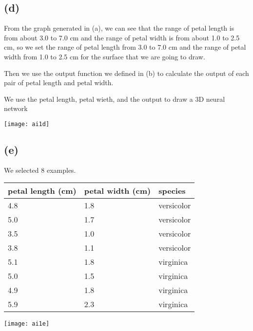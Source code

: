\documentclass[11pt]{article}
\begin{document}
\subsection*{(d)}

From the graph generated in (a), we can see that the range of petal length is from about 3.0 to 7.0 cm and the range of petal width is from about 1.0 to 2.5 cm,
so we set the range of petal length from 3.0 to 7.0 cm and the range of petal width from 1.0 to 2.5 cm for the surface that we are going to draw.

Then we use the output function we defined in (b) to calculate the output of each pair of petal length and petal width.

We use the petal length, petal wieth, and the output to draw a 3D neural network

\texttt{[image: ai1d]}

\subsection*{(e)}

We selected 8 examples. 

\begin{tabular}{|l l l|}
    \hline
    petal length (cm) & petal width (cm) & species\\
    \hline
    4.8 & 1.8 & versicolor\\
    5.0 & 1.7 & versicolor\\
    3.5 & 1.0 & versicolor\\
    3.8 & 1.1 & versicolor\\
    5.1 & 1.8 & virginica \\
    5.0 & 1.5 & virginica \\
    4.9 & 1.8 & virginica \\
    5.9 & 2.3 & virginica \\
    \hline
\end{tabular}

\texttt{[image: ai1e]}
\end{document}
